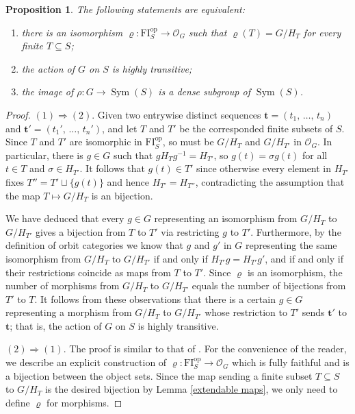 \documentclass[11pt, reqno]{amsart}
\theoremstyle{plain}
\newtheorem{proposition}[theorem]{Proposition}
\numberwithin{equation}{section}
\theoremstyle{definition}
\DeclareMathOperator{\Sym}{Sym}
\newcommand{\FI}{{\mathrm{FI}}}
\newcommand{\op}{{\mathrm{op}}}
\begin{document}
\begin{proposition} \label{characterization for FI}
The following statements are equivalent:
\begin{enumerate}
\item there is an isomorphism $\varrho: \FI^{\op}_S \to \mathcal{O}_G$ such that $\varrho(T) = G/H_T$ for every finite $T \subseteq S$;

\item the action of $G$ on $S$ is highly transitive;

\item the image of $\rho: G \to \Sym(S)$ is a dense subgroup of $\Sym(S)$.
\end{enumerate}
\end{proposition}

\begin{proof}
$(1) \Rightarrow (2)$. Given two entrywise distinct sequences $\mathbf{t} = (t_1, \, \ldots, \, t_n)$ and $\mathbf{t}' = (t_1', \, \ldots, \, t_n')$, and let $T$ and $T'$ be the corresponded finite subsets of $S$. Since $T$ and $T'$ are isomorphic in $\FI^{\op}_S$, so must be $G/H_T$ and $G/H_{T'}$ in $\mathcal{O}_G$. In particular, there is $g \in G$ such that $gH_Tg^{-1} = H_{T'}$, so $g(t) = \sigma g(t)$ for all $t \in T$ and $\sigma \in H_{T'}$. It follows that $g(t) \in T'$ since otherwise every element in $H_{T'}$ fixes $T'' = T' \sqcup \{g(t) \}$ and hence $H_{T'} = H_{T''}$, contradicting the assumption that the map $T \mapsto G/H_T$ is an bijection.

We have deduced that every $g \in G$ representing an isomorphism from $G/H_T$ to $G/H_{T'}$ gives a bijection from $T$ to $T'$ via restricting $g$ to $T'$. Furthermore, by the definition of orbit categories we know that $g$ and $g'$ in $G$ representing the same isomorphism from $G/H_T$ to $G/H_{T'}$ if and only if $H_{T'} g = H_{T'} g'$, and if and only if their restrictions coincide as maps from $T$ to $T'$. Since $\varrho$ is an isomorphism, the number of morphisms from $G/H_T$ to $G/H_{T'}$ equals the number of bijections from $T'$ to $T$. It follows from these observations that there is a certain $g \in G$ representing a morphism from $G/H_T$ to $G/H_{T'}$ whose restriction to $T'$ sends $\mathbf{t}'$ to $\mathbf{t}$; that is, the action of $G$ on $S$ is highly transitive.

$(2) \Rightarrow (1)$. The proof is similar to that of \cite[Theorem III.9.2]{MM}. For the convenience of the reader, we describe an explicit construction of $\varrho: \FI_S^{\op} \to \mathcal{O}_G$ which is fully faithful and is a bijection between the object sets. Since the map sending a finite subset $T \subseteq S$ to $G/H_T$ is the desired bijection by Lemma \ref{extendable maps}, we only need to define $\varrho$ for morphisms.


\end{proof}
\end{document}
